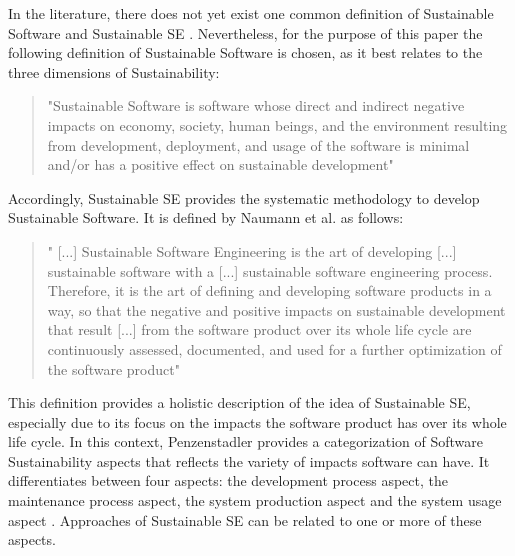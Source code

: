 \documentclass[oribibl]{llncs}
\begin{document}
In the literature, there does not yet exist one common definition of Sustainable Software and Sustainable SE \cite{venters_software_2014}. Nevertheless, for the purpose of this paper the following definition of Sustainable Software is chosen, as it best relates to the three dimensions of Sustainability: 
\begin{quote}
	"Sustainable Software is software whose direct and indirect negative impacts on economy, society, human beings, and the environment resulting from development, deployment, and usage of the software is minimal and/or has a positive effect on sustainable development" \cite[p.\,3]{dick_model_2010}
\end{quote}
Accordingly, Sustainable SE provides the systematic methodology to develop Sustainable Software. It is defined by Naumann et al. as follows:
\begin{quote}
	" [...] Sustainable Software Engineering is the art of developing [...] sustainable software with a [...] sustainable software engineering process. Therefore, it is the art of defining and developing software products in a way, so that the negative and positive impacts on sustainable development that result [...] from the software product over its whole life cycle are continuously assessed, documented, and used for a further optimization of the software product" \cite[p.\,3]{naumann_greensoft_2011} %
\end{quote}
This definition provides a holistic description of the idea of Sustainable SE, especially due to its focus on the impacts the software product has over its whole life cycle. %
In this context, Penzenstadler \cite{penzenstadler_supporting_2012} provides a categorization of Software Sustainability aspects that reflects the variety of impacts software can have. It differentiates between four aspects: the development process aspect, the maintenance process aspect, the system production aspect and the system usage aspect \cite{penzenstadler_supporting_2012}. Approaches of Sustainable SE can be related to one or more of these aspects. %
\end{document}
